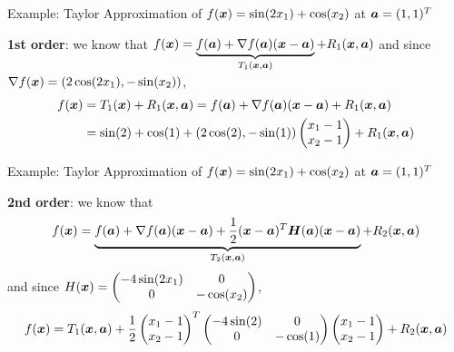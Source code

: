 \documentclass[11pt,compress,t,notes=noshow, xcolor=table]{beamer}
\begin{document}
\begin{framev}{Example: Taylor Approximation of $\fx = \sin(2\MakeLowercase{x}_1) + \cos(\MakeLowercase{x}_2)$ at $\bm{\MakeLowercase{a}} = (1, 1)^T$}
\,\\
\begin{footnotesize}
\textbf{1st order}: we know that $f(\bm{x}) = \underbrace{f(\bm{a}) + \nabla f(\bm{a}) (\bm{x} - \bm{a})}_{T_1(\bm{x}, \bm{a})} + R_1(\bm{x},\bm{a})$
and since  $\nabla f(\bm{x}) = \left(2\cos(2x_1), -\sin(x_2)\right)$,
\begin{align*}
f(\bm{x}) &= T_1(\bm{x}) + R_1(\bm{x}, \bm{a}) = f(\bm{a}) + \nabla f(\bm{a}) (\bm{x} - \bm{a}) + R_1(\bm{x}, \bm{a})\\
&= \sin(2) + \cos(1) + (2 \cos(2), - \sin(1))\begin{pmatrix} x_1 - 1 \\ x_2 - 1\end{pmatrix} + R_1(\bm{x}, \bm{a})
\end{align*}
\end{footnotesize}
\vspace*{-0.5\baselineskip}
{}
\end{framev}


\begin{framev}{Example: Taylor Approximation of $\fx = \sin(2\MakeLowercase{x}_1) + \cos(\MakeLowercase{x}_2)$ at $\bm{\MakeLowercase{a}} = (1, 1)^T$}
\,\\
\begin{footnotesize}
\textbf{2nd order}: we know that
$$
f(\bm{x}) = \underbrace{f(\bm{a}) + \nabla f(\bm{a}) (\bm{x} - \bm{a}) + \frac{1}{2}(\bm{x} - \bm{a})^T\bm{H}(\bm{a})(\bm{x} - \bm{a})}_{T_2(\bm{x}, \bm{a})} + R_2(\bm{x},\bm{a})
$$
and since $H(\bm{x}) = \begin{pmatrix} -4 \sin(2x_1) & 0 \\ 0 & -\cos(x_2) \end{pmatrix}$,
$$
f(\bm{x}) = T_1(\bm{x}, \bm{a}) + \frac{1}{2}\begin{pmatrix}x_1 - 1 \\ x_2 - 1 \end{pmatrix}^T \begin{pmatrix} -4 \sin(2) & 0 \\ 0 & -\cos(1) \end{pmatrix} \begin{pmatrix}x_1 - 1 \\ x_2 - 1 \end{pmatrix} + R_2(\bm{x}, \bm{a})
$$
\end{footnotesize}
\vspace*{-0.5\baselineskip}
\end{framev}

\endlecture
\end{document}
